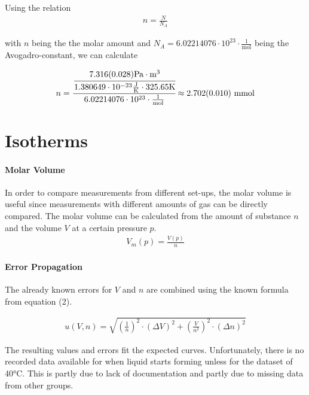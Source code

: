 \documentclass[10pt,a4paper]{article}
\begin{document}
\bigskip

Using the relation
\begin{align}
n = \frac{N}{N_A}
\end{align}

with $n$ being the the molar amount and $N_A = 6.02214076 \cdot 10^{23} \cdot \frac{1}{\textrm{mol}} $ being the Avogadro-constant, we can calculate

\begin{align}
n = \cfrac{\cfrac{7.316(0.028) \textrm{Pa} \cdot \text{m}^3}{1.380649 \cdot 10^{-23} \frac{\textrm{J}}{\textrm{K}} \cdot 325.65 \textrm{K} }}{6.02214076 \cdot 10^{23} \cdot \frac{1}{\textrm{mol}}} \approx 2.702 (0.010) \ \textrm{mmol}
\end{align}

\section{Isotherms}
\medskip

\paragraph{Molar Volume}

In order to compare measurements from different set-ups, the molar volume is useful since measurements with different amounts of gas can be directly compared.
The molar volume can be calculated from the amount of substance $n$ and the volume $V$ at a certain pressure $p$.
\begin{align}
V_m(p) = \frac{V(p)}{n}
\end{align}

\paragraph{Error Propagation}

The already known errors for $V$ and $n$ are combined using the known formula from equation (2).

\begin{align}
u(V, n) = \sqrt{(\frac{1}{n})^2\cdot (\Delta V)^2 + (\frac{V}{n^2})^2 \cdot (\Delta n)^2 }
\end{align}

The resulting values and errors fit the expected curves. Unfortunately, there is no recorded data available for when liquid starts forming unless for the dataset of 40°C. This is partly due to lack of documentation and partly due to missing data from other groups.
\end{document}
